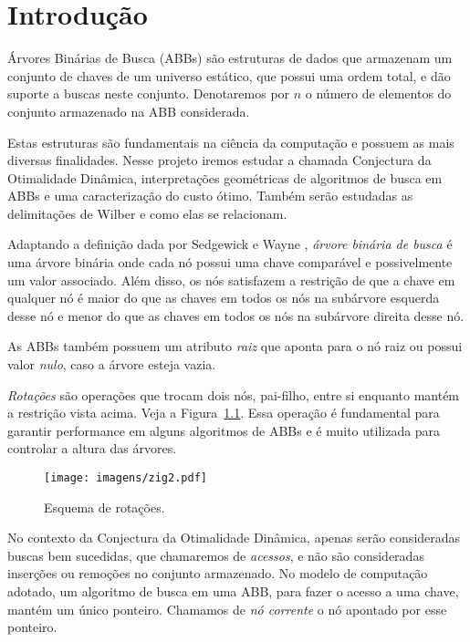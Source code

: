
\chapter{Introdução}
\label{cap:introducao}

Árvores Binárias de Busca (ABBs) são estruturas de dados que armazenam um conjunto de chaves de um universo estático, que possui uma ordem total, e dão suporte a buscas neste conjunto. Denotaremos por $n$ o número de elementos do conjunto armazenado na ABB considerada.

Estas estruturas são fundamentais na ciência da computação e possuem as mais diversas finalidades. Nesse projeto iremos estudar a chamada Conjectura da Otimalidade Dinâmica, interpretações geométricas de algoritmos de busca em ABBs e uma caracterização do custo ótimo. Também serão estudadas as delimitações de Wilber e como elas se relacionam.

Adaptando a definição dada por Sedgewick e Wayne \cite{Sedgewick}, \textit{árvore binária de busca} é uma árvore binária onde cada nó possui uma chave comparável e possivelmente um valor associado. Além disso, os nós satisfazem a restrição de que a chave em qualquer nó é maior do que as chaves em todos os nós na subárvore esquerda desse nó e menor do que as chaves em todos os nós na subárvore direita desse nó.

As ABBs também possuem um atributo \textit{raiz} que aponta para o nó raiz ou possui valor \textit{nulo}, caso a árvore esteja vazia.

\textit{Rotações} são operações que trocam dois nós, pai-filho, entre si enquanto mantém a restrição vista acima. Veja a Figura~\ref{fig:imagem}. Essa operação é fundamental para garantir performance em alguns algoritmos de ABBs e é muito utilizada para controlar a altura das árvores.

\begin{figure}[h]
    \centering
    \texttt{[image: imagens/zig2.pdf]}
    \caption{Esquema de rotações.}
    \label{fig:imagem}
\end{figure}

No contexto da Conjectura da Otimalidade Dinâmica, apenas serão consideradas buscas bem sucedidas, que chamaremos de \textit{acessos}, e não são consideradas inserções ou remoções no conjunto armazenado. No modelo de computação adotado, um algoritmo de busca em uma ABB, para fazer o acesso a uma chave, mantém um único ponteiro. Chamamos de \textit{nó corrente} o nó apontado por esse ponteiro. 

